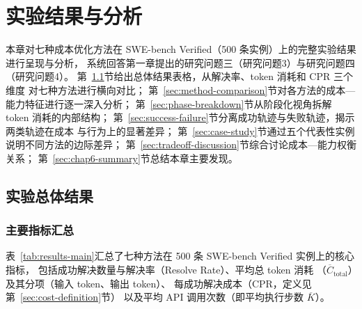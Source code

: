 \chapter{实验结果与分析}
\label{chap:results}

本章对七种成本优化方法在 SWE-bench Verified（500 条实例）上的完整实验结果进行呈现与分析，
系统回答第一章提出的研究问题三（研究问题3）与研究问题四（研究问题4）。
第~\ref{sec:overall-results}节给出总体结果表格，从解决率、token 消耗和 CPR 三个维度
对七种方法进行横向对比；
第~\ref{sec:method-comparison}节对各方法的成本—能力特征进行逐一深入分析；
第~\ref{sec:phase-breakdown}节从阶段化视角拆解 token 消耗的内部结构；
第~\ref{sec:success-failure}节分离成功轨迹与失败轨迹，揭示两类轨迹在成本
与行为上的显著差异；
第~\ref{sec:case-study}节通过五个代表性实例说明不同方法的边际差异；
第~\ref{sec:tradeoff-discussion}节综合讨论成本—能力权衡关系；
第~\ref{sec:chap6-summary}节总结本章主要发现。

\section{实验总体结果}
\label{sec:overall-results}

\subsection{主要指标汇总}
\label{subsec:main-table}

表~\ref{tab:results-main}汇总了七种方法在 500 条 SWE-bench Verified 实例上的核心指标，
包括成功解决数量与解决率（Resolve Rate）、平均总 token 消耗
（$\overline{C}_{\text{total}}$）及其分项（输入 token、输出 token）、
每成功解决成本（CPR，定义见第~\ref{sec:cost-definition}节）
以及平均 API 调用次数（即平均执行步数 $\overline{K}$）。

